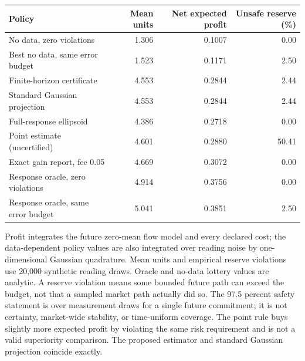\documentclass[12pt]{article}
\theoremstyle{definition}
\theoremstyle{remark}
\begin{document}
\begin{center}\footnotesize
\begin{tabular}{p{}rrr}
\toprule
Policy & Mean units & Net expected profit & Unsafe reserve (\%)\\
\midrule
No data, zero violations & 1.306 & 0.1007 & 0.00\\
Best no data, same error budget & 1.523 & 0.1171 & 2.50\\
Finite-horizon certificate & 4.553 & 0.2844 & 2.44\\
Standard Gaussian projection & 4.553 & 0.2844 & 2.44\\
Full-response ellipsoid & 4.386 & 0.2718 & 0.00\\
Point estimate (uncertified) & 4.601 & 0.2880 & 50.41\\
Exact gain report, fee 0.05 & 4.669 & 0.3072 & 0.00\\
Response oracle, zero violations & 4.914 & 0.3756 & 0.00\\
Response oracle, same error budget & 5.041 & 0.3851 & 2.50\\
\bottomrule\end{tabular}\end{center}
Profit integrates the future zero-mean flow model and every declared cost;
the data-dependent policy values are also integrated over reading noise by
one-dimensional Gaussian quadrature. Mean units and empirical reserve
violations use 20,000 synthetic reading draws. Oracle and no-data lottery
values are analytic. A reserve violation means some bounded future path can
exceed the budget, not that a sampled market path actually did so.
The 97.5 percent safety statement is over measurement draws for a single
future commitment; it is not certainty, market-wide stability, or time-uniform
coverage. The point rule buys slightly more expected profit by violating the
same risk requirement and is not a valid superiority comparison.
The proposed estimator and standard Gaussian projection coincide exactly.
\end{document}
